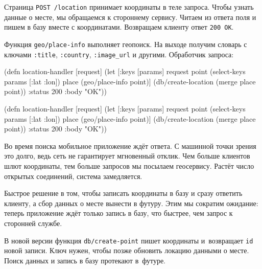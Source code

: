 Страница \verb|POST /location| принимает координаты в теле запроса. Чтобы
узнать данные о месте, мы обращаемся к стороннему сервису. Читаем из ответа поля
и пишем в базу вместе с координатами. Возвращаем клиенту ответ \verb|200 OK|.

Функция \verb|geo/place-info| выполняет геопоиск. На выходе получим
словарь с ключами \verb|:title|, \verb|:country|, \verb|:image_url| и
другими. Обработчик запроса:

\ifx\DEVICETYPE\MOBILE

\begin{english}
  \begin{clojure}
(defn location-handler [request]
  (let [{:keys [params]} request
        point (select-keys params
                [:lat :lon])
        place (geo/place-info point)]
    (db/create-location
      (merge place point))
    {:status 200 :body "OK"}))
  \end{clojure}
\end{english}

\else

\begin{english}
  \begin{clojure}
(defn location-handler [request]
  (let [{:keys [params]} request
        point (select-keys params [:lat :lon])
        place (geo/place-info point)]
    (db/create-location (merge place point))
    {:status 200 :body "OK"}))
  \end{clojure}
\end{english}

\fi

Во время поиска мобильное приложение ждёт ответа. С машинной точки зрения это
долго, ведь сеть не гарантирует мгновенный отклик. Чем больше клиентов шлют
координаты, тем больше запросов мы посылаем геосервису. Растёт число
открытых соединений, система замедляется.


Быстрое решение в том, чтобы записать координаты в базу и сразу ответить
клиенту, а сбор данных о месте вынести в футуру. Этим мы сократим ожидание:
теперь приложение ждёт только запись в базу, что быстрее, чем запрос к сторонней
службе.

В новой версии функция \verb|db/create-point| пишет координаты и~возвращает
\verb|id| новой записи. Ключ нужен, чтобы позже обновить локацию данными о
месте. Поиск данных и запись в базу протекают в~футуре.

\ifx\DEVICETYPE\MOBILE

